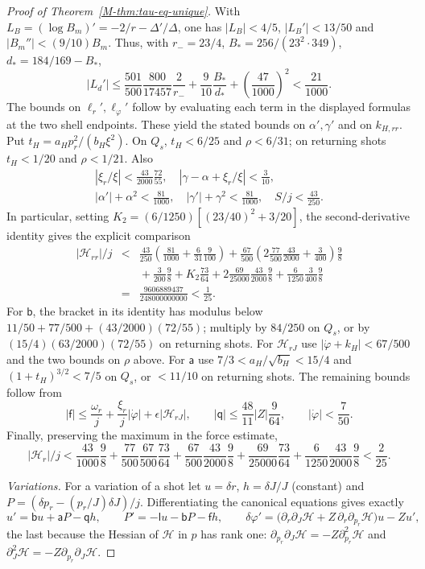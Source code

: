 \documentclass[aip,jmp,amsmath,amssymb,reprint]{revtex4-2}
\theoremstyle{plain}
\theoremstyle{definition}
\begin{document}
\begin{proof}[Proof of Theorem~\ref{M-thm:tau-eq-unique}]
With $L_B=(\log B_m)'=-2/r-\Delta'/\Delta$, one has
$|L_B|<4/5$, $|L_B'|<13/50$ and $|B_m''|<(9/10)B_m$. Thus, with
$r_-=23/4$, $B_*=256/(23^2\cdot349)$, $d_*=184/169-B_*$,
\[
 |L_d'|\le\frac{501}{500}\frac{800}{17457}\frac2{r_-}
       +\frac9{10}\frac{B_*}{d_*}
       +\left(\frac{47}{1000}\right)^2<\frac{21}{1000}.
\]
The bounds on $\ell_r',\ell_\varphi'$ follow by evaluating each term
in the displayed formulas at the two shell endpoints. These yield the stated
bounds on $\alpha',\gamma'$ and on $k_{H,rr}$.
Put $t_H=a_Hp_r^2/(b_H\xi^2)$. On $Q_s$, $t_H<6/25$ and $\rho<6/31$;
on returning shots $t_H<1/20$ and $\rho<1/21$. Also
\[
 \begin{array}{l}
 \displaystyle |\xi_r/\xi|<\frac{43}{2000}\frac{72}{55},\quad
 |\gamma-\alpha+\xi_r/\xi|<\frac3{10},\\[8pt]
 \displaystyle |\alpha'|+\alpha^2<\frac{81}{1000},\quad
 |\gamma'|+\gamma^2<\frac{81}{1000},\quad S/j<\frac{43}{250}.
 \end{array}
\]
In particular, setting $K_2=(6/1250)[(23/40)^2+3/20]$, the second-derivative
identity gives the explicit comparison
\begin{eqnarray*}
 |\mathcal H_{rr}|/j
 &<&\frac{43}{250}\left(\frac{81}{1000}+\frac6{31}\frac9{100}\right)
 +\frac{67}{500}\left(2\frac{77}{500}\frac{43}{2000}+\frac3{400}\right)\frac98\\
 &&{}+\frac3{200}\frac98+K_2\frac{73}{64}
 +2\frac{69}{25000}\frac{43}{2000}\frac98
 +\frac6{1250}\frac3{400}\frac98\\
 &=&\frac{9606889437}{248000000000}<\frac1{25}.
\end{eqnarray*}
For $\mathsf b$, the bracket in its identity has modulus below
$11/50+77/500+(43/2000)(72/55)$; multiply by $84/250$ on $Q_s$, or by
$(15/4)(63/2000)(72/55)$ on returning shots. For $\mathcal H_{rJ}$ use
$|\dot\varphi+k_H|<67/500$ and the two bounds on $\rho$ above.
For $\mathsf a$ use $7/3<a_H/\sqrt{b_H}<15/4$ and
$(1+t_H)^{3/2}<7/5$ on $Q_s$, or $<11/10$ on returning shots.
The remaining bounds follow from
\[
 |\mathsf f|\le\frac{\omega_r}{j}
       +\frac{\xi_r}{j}|\dot\varphi|+\epsilon|\mathcal H_{rJ}|,
 \qquad |\mathsf q|\le\frac{48}{11}|Z|\frac9{64},
 \qquad |\dot\varphi|<\frac7{50}.
\]
Finally, preserving the maximum in the force estimate,
\[
 |\mathcal H_r|/j<\frac{43}{1000}\frac98
 +\frac{77}{500}\frac{67}{500}\frac{73}{64}
 +\frac{67}{500}\frac{43}{2000}\frac98
 +\frac{69}{25000}\frac{73}{64}
 +\frac6{1250}\frac{43}{2000}\frac98<\frac2{25}.
\]

\emph{Variations.} For a variation of a shot let $u=\delta r$, $h=\delta J/J$ (constant) and
$P=(\delta p_r-(p_r/J)\delta J)/j$. Differentiating the canonical equations gives exactly
\[
  u'=\mathsf bu+\mathsf aP-\mathsf qh,\qquad P'=-\mathsf lu-\mathsf bP-\mathsf fh,\qquad
  \delta\varphi'=\bigl(\partial_r\partial_J\mathcal H+Z\,\partial_r\partial_{p_r}\mathcal H\bigr)u-Zu' ,
\]
the last because the Hessian of $\mathcal H$ in $p$ has rank one: $\partial_{p_r}\partial_J\mathcal H=-Z\partial^2_{p_r}\mathcal H$
and $\partial_J^2\mathcal H=-Z\partial_{p_r}\partial_J\mathcal H$.


\end{proof}
\end{document}
